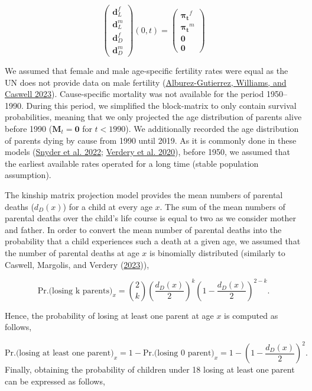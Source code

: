 \documentclass[
  11pt,
  letterpaper,
]{article}
\begin{document}
\[\begin{pmatrix} \boldsymbol{d}^f_L \\ 
\boldsymbol{d}^m_L \\ 
\hline \boldsymbol{d}^f_D \\ 
\boldsymbol{d}^m_D 
\end{pmatrix}(0, t)
=
\begin{pmatrix} \boldsymbol{\pi_t}^f \\ 
\boldsymbol{\pi_t}^m \\ 
\hline \boldsymbol{0} \\ 
\boldsymbol{0} 
\end{pmatrix}
\]

We assumed that female and male age-specific fertility rates were equal as the UN does not provide data on male fertility (\protect\hyperlink{ref-alburez2023projections}{Alburez-Gutierrez, Williams, and Caswell 2023}).
Cause-specific mortality was not available for the period 1950--1990. During this period, we simplified the block-matrix to only contain survival probabilities, meaning that we only projected the age distribution of parents alive before 1990 (\(\boldsymbol{M}_t = \boldsymbol{0}\) for \(t < 1990\)). We additionally recorded the age distribution of parents dying by cause from 1990 until 2019. As it is commonly done in these models (\protect\hyperlink{ref-snyder2022covid}{Snyder et al. 2022}; \protect\hyperlink{ref-verdery2020covid}{Verdery et al. 2020}), before 1950, we assumed that the earliest available rates operated for a long time (stable population assumption).

The kinship matrix projection model provides the mean numbers of parental deaths (\(d_D(x)\)) for a child at every age \(x\). The sum of the mean numbers of parental deaths over the child's life course is equal to two as we consider mother and father. In order to convert the mean number of parental deaths into the probability that a child experiences such a death at a given age, we assumed that the number of parental deaths at age \(x\) is binomially distributed (similarly to Caswell, Margolis, and Verdery (\protect\hyperlink{ref-caswell2023formal}{2023})),

\[\text{Pr.(losing k parents)}_x = \binom{2}{k}\left(\frac{d_D(x)}{2}\right)^k\left(1-\frac{d_D(x)}{2}\right)^{2-k}.\]

Hence, the probability of losing at least one parent at age \(x\) is computed as follows,

\[\text{Pr.(losing at least one parent)}_x = 1 - \text{Pr.(losing 0 parent)}_x = 1 -  \left(1-\frac{d_D(x)}{2}\right)^2.\]
Finally, obtaining the probability of children under 18 losing at least one parent can be expressed as follows,
\end{document}
